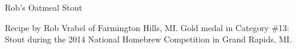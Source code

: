 \begin{recipe}{Rob's Oatmeal Stout}

\begin{aboutblock}
Recipe by Rob Vrabel of Farmington Hills, MI. Gold medal in Category \#13: Stout
during the 2014 National Homebrew Competition in Grand Rapids, MI. \sourceaha
\end{aboutblock}


\begin{methodandtiming}

\begin{mashsteps}
\end{mashsteps}

\begin{fermentationsteps}
\end{fermentationsteps}

\end{methodandtiming}

\recipebreak

\begin{ingredientsblock}

\begin{malts}
\end{malts}

\begin{hops}
\end{hops}


\end{ingredientsblock}

\end{recipe}


